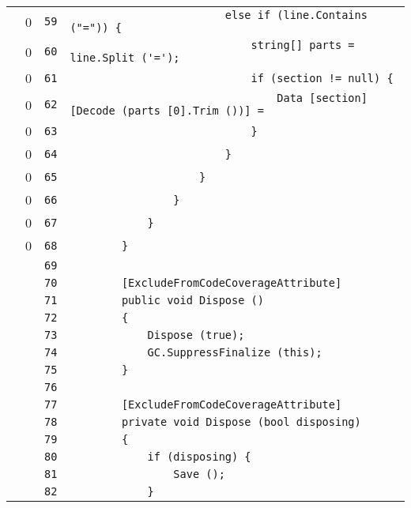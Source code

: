 \documentclass[a4paper,10pt]{article}
\begin{document}
\begin{longtable}[l]{lrrl}
\cellcolor{red} & 0 & \verb~59~ & \verb~                        else if (line.Contains ("=")) {~\\
\cellcolor{red} & 0 & \verb~60~ & \verb~                            string[] parts = line.Split ('=');~\\
\cellcolor{red} & 0 & \verb~61~ & \verb~                            if (section != null) {~\\
\cellcolor{red} & 0 & \verb~62~ & \verb~                                Data [section] [Decode (parts [0].Trim ())] = ~\\
\cellcolor{red} & 0 & \verb~63~ & \verb~                            }~\\
\cellcolor{red} & 0 & \verb~64~ & \verb~                        }~\\
\cellcolor{red} & 0 & \verb~65~ & \verb~                    }~\\
\cellcolor{red} & 0 & \verb~66~ & \verb~                }~\\
\cellcolor{red} & 0 & \verb~67~ & \verb~            }~\\
\cellcolor{red} & 0 & \verb~68~ & \verb~        }~\\
\cellcolor{gray} &  & \verb~69~ & \verb~~\\
\cellcolor{gray} &  & \verb~70~ & \verb~        [ExcludeFromCodeCoverageAttribute]~\\
\cellcolor{gray} &  & \verb~71~ & \verb~        public void Dispose ()~\\
\cellcolor{gray} &  & \verb~72~ & \verb~        {~\\
\cellcolor{gray} &  & \verb~73~ & \verb~            Dispose (true);~\\
\cellcolor{gray} &  & \verb~74~ & \verb~            GC.SuppressFinalize (this);~\\
\cellcolor{gray} &  & \verb~75~ & \verb~        }~\\
\cellcolor{gray} &  & \verb~76~ & \verb~~\\
\cellcolor{gray} &  & \verb~77~ & \verb~        [ExcludeFromCodeCoverageAttribute]~\\
\cellcolor{gray} &  & \verb~78~ & \verb~        private void Dispose (bool disposing)~\\
\cellcolor{gray} &  & \verb~79~ & \verb~        {~\\
\cellcolor{gray} &  & \verb~80~ & \verb~            if (disposing) {~\\
\cellcolor{gray} &  & \verb~81~ & \verb~                Save ();~\\
\cellcolor{gray} &  & \verb~82~ & \verb~            }~\\

\end{longtable}
\end{document}
